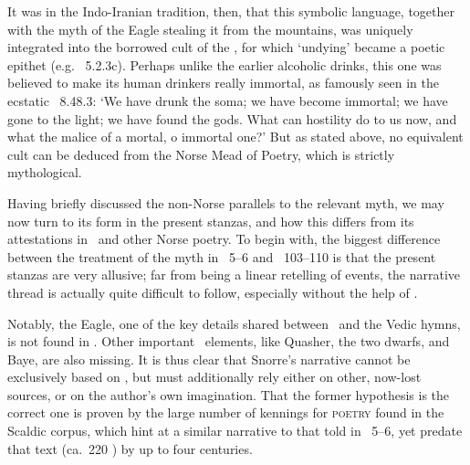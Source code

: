 It was in the Indo-Iranian tradition, then, that this symbolic language, together with the myth of the Eagle stealing it from the mountains, was uniquely integrated into the borrowed cult of the , for which  ‘undying’ became a poetic epithet (e.g. \Rigveda\ 5.2.3c).
Perhaps unlike the earlier alcoholic drinks, this one was believed to make its human drinkers really immortal, as famously seen in the ecstatic \Rigveda\ 8.48.3:  ‘We have drunk the soma; we have become immortal; we have gone to the light; we have found the gods.  What can hostility do to us now, and what the malice of a mortal, o immortal one?’  But as stated above, no equivalent cult can be deduced from the Norse Mead of Poetry, which is strictly mythological.

Having briefly discussed the non-Norse parallels to the relevant myth, we may now turn to its form in the present stanzas, and how this differs from its attestations in \Skaldskaparmal\ and other Norse poetry.  To begin with, the biggest difference between the treatment of the myth in \Skaldskaparmal\ 5--6 and \Havamal\ 103--110 is that the present stanzas are very allusive; far from being a linear retelling of events, the narrative thread is actually quite difficult to follow, especially without the help of \Skaldskaparmal.

Notably, the Eagle, one of the key details shared between \Skaldskaparmal\ and the Vedic hymns, is not found in \Havamal.  Other important \Skaldskaparmal\ elements, like Quasher, the two dwarfs, and Baye, are also missing.  It is thus clear that Snorre’s narrative cannot be exclusively based on \Havamal, but must additionally rely either on other, now-lost sources, or on the author’s own imagination.  That the former hypothesis is the correct one is proven by the large number of kennings for \textsc{poetry} found in the Scaldic corpus, which hint at a similar narrative to that told in \Skaldskaparmal\ 5--6, yet predate that text (ca.~220 \ce) by up to four centuries.

